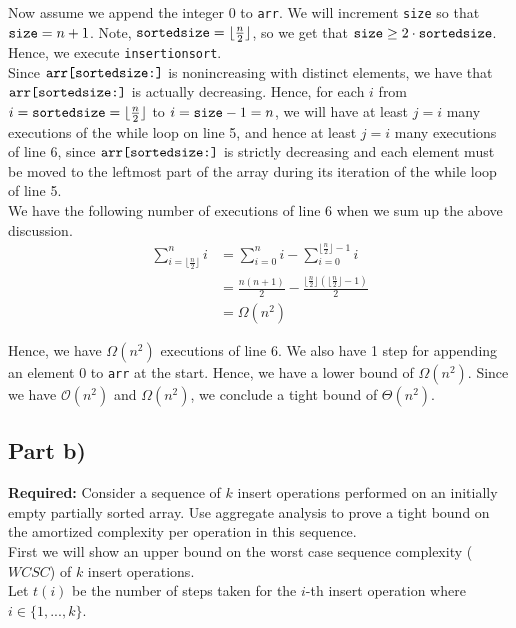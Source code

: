 \documentclass[12pt]{article}
\begin{document}
Now assume we append the integer $0$ to \verb|arr|. We will increment \verb|size| so that $\verb|size| = n + 1$. Note, $\verb|sortedsize| = \lfloor \frac{n}{2} \rfloor$, so we get that $\verb|size| \geq 2 \cdot \verb|sortedsize|$. Hence, we execute \verb|insertionsort|. \\

Since $\verb|arr[sortedsize:]|$ is nonincreasing with distinct elements, we have that $\verb|arr[sortedsize:]|$ is actually decreasing. Hence, for each $i$ from $i = \verb|sortedsize| = \lfloor \frac{n}{2} \rfloor$ to $i = \verb|size|-1 = n$, we will have at least $j=i$ many executions of the while loop on line 5, and hence at least $j = i$ many executions of line 6, since $\verb|arr[sortedsize:]|$ is strictly decreasing and each element must be moved to the leftmost part of the array during its iteration of the while loop of line 5. \\

We have the following number of executions of line 6 when we sum up the above discussion. 
\begin{align*}
\sum_{i = \lfloor \frac{n}{2} \rfloor}^n i &= \sum_{i=0}^{n} i - \sum_{i=0}^{\lfloor \frac{n}{2} \rfloor - 1} i \\
&= \frac{n(n+1)}{2} - \frac{\lfloor \frac{n}{2} \rfloor(\lfloor \frac{n}{2} \rfloor-1)}{2} \\
&= \Omega(n^2)
\end{align*}

Hence, we have $\Omega(n^2)$ executions of line 6. We also have 1 step for appending an element $0$ to \verb|arr| at the start. Hence, we have a lower bound of $\Omega(n^2)$. Since we have $\mathcal{O}(n^2)$ and $\Omega(n^2)$, we conclude a tight bound of $\Theta(n^2)$. 

\subsection*{Part b)}

\textbf{Required:} Consider a sequence of $k$ insert operations performed on an initially empty partially sorted array. Use aggregate analysis to prove a tight bound on the amortized complexity per operation in this sequence. \\

First we will show an upper bound on the worst case sequence complexity ($WCSC$) of $k$ insert operations. \\

Let $t(i)$ be the number of steps taken for the $i$-th insert operation where $i \in \{1,...,k\}$. \\
\end{document}
